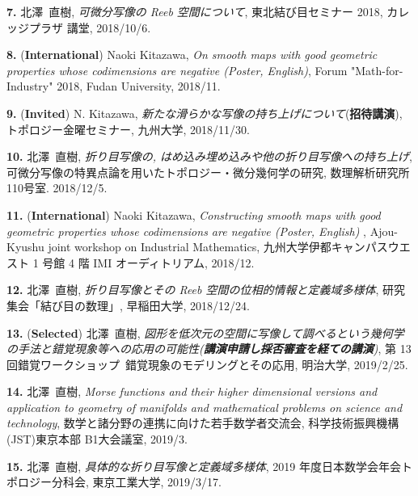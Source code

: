 \documentclass{article}
\begin{document}
\par\noindent
{\bf 7.} 北澤\ 直樹, \textsl{可微分写像の Reeb 空間について}, 東北結び目セミナー 2018, カレッジプラザ 講堂, 2018/10/6.

\par\noindent
{\bf 8.} ({\bf International}) Naoki Kitazawa, \textsl{On smooth maps with good geometric properties whose codimensions are negative {\rm (}Poster, English{\rm )}}, Forum "Math-for-Industry" 2018, Fudan University, 2018/11.

\par\noindent
{\bf 9.} ({\bf  Invited}) N. Kitazawa, \textsl{新たな滑らかな写像の持ち上げについて}({\bf 招待講演}), トポロジー金曜セミナー, 九州大学, 2018/11/30.　　　

\par\noindent
{\bf 10.} 北澤\ 直樹, \textsl{折り目写像の, はめ込み埋め込みや他の折り目写像への持ち上げ}, 可微分写像の特異点論を用いたトポロジー・微分幾何学の研究, 数理解析研究所 110号室. 2018/12/5.

\par\noindent
{\bf 11.}  ({\bf International}) Naoki Kitazawa, \textsl{Constructing smooth maps with good geometric properties whose codimensions are negative {\rm (}Poster, English{\rm )}
}, Ajou-Kyushu joint workshop  on Industrial Mathematics, 九州大学伊都キャンパスウエスト 1 号館 4 階 IMI オーディトリアム, 2018/12.

\par\noindent
{\bf 12.} 北澤\ 直樹, \textsl{折り目写像とその Reeb 空間の位相的情報と定義域多様体}, 研究集会「結び目の数理」, 早稲田大学, 2018/12/24.

\par\noindent
{\bf 13.} ({\bf Selected}) 北澤\ 直樹, \textsl{図形を低次元の空間に写像して調べるという幾何学の手法と錯覚現象等への応用の可能性{\rm (}{\bf 講演申請し採否審査を経ての講演}{\rm )}}, 第 13 回錯覚ワークショップ\ 錯覚現象のモデリングとその応用, 明治大学, 2019/2/25.

\par\noindent
{\bf 14.} 北澤\ 直樹, \textsl{Morse functions and their higher dimensional versions and application to geometry of manifolds and mathematical problems on science and technology}, 数学と諸分野の連携に向けた若手数学者交流会, 科学技術振興機構(JST)東京本部 B1大会議室, 2019/3.

\par\noindent
{\bf 15.} 北澤\ 直樹, \textsl{具体的な折り目写像と定義域多様体}, 2019 年度日本数学会年会トポロジー分科会, 東京工業大学, 2019/3/17.　　　
\end{document}
